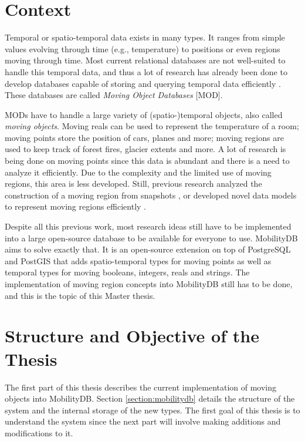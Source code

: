 
\section{Context}

Temporal or spatio-temporal data exists in many types. It ranges from simple values evolving through time (e.g., temperature) to positions or even regions moving through time. Most current relational databases are not well-suited to handle this temporal data, and thus a lot of research has already been done to develop databases capable of storing and querying temporal data efficiently \cite{moving_obj_databases}. These databases are called \textit{Moving Object Databases} [MOD].

MODs have to handle a large variety of (spatio-)temporal objects, also called \textit{moving objects}. Moving reals can be used to represent the temperature of a room; moving points store the position of cars, planes and more; moving regions are used to keep track of forest fires, glacier extents and more. A lot of research is being done on moving points since this data is abundant and there is a need to analyze it efficiently. Due to the complexity and the limited use of moving regions, this area is less developed. Still, previous research analyzed the construction of a moving region from snapshots \cite{repr_from_obs,high_quality_interpol}, or developed novel data models to represent moving regions efficiently \cite{polyhedra,fmregion}.

Despite all this previous work, most research ideas still have to be implemented into a large open-source database to be available for everyone to use. MobilityDB \cite{mobilitydb} aims to solve exactly that. It is an open-source extension on top of PostgreSQL \cite{postgresql} and PostGIS \cite{postgis} that adds spatio-temporal types for moving points as well as temporal types for moving booleans, integers, reals and strings. The implementation of moving region concepts into MobilityDB still has to be done, and this is the topic of this Master thesis.

\section{Structure and Objective of the Thesis}

The first part of this thesis describes the current implementation of moving objects into MobilityDB. Section \ref{section:mobilitydb} details the structure of the system and the internal storage of the new types. The first goal of this thesis is to understand the system since the next part will involve making additions and modifications to it.

